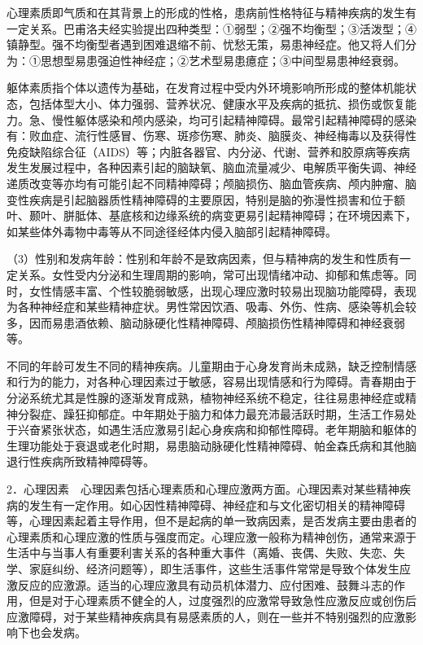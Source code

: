 心理素质即气质和在其背景上的形成的性格，患病前性格特征与精神疾病的发生有一定关系。巴甫洛夫经实验提出四种类型：①弱型；②强不均衡型；③活泼型；④镇静型。强不均衡型者遇到困难退缩不前、忧愁无策，易患神经症。他又将人们分为：①思想型易患强迫性神经症；②艺术型易患癔症；③中间型易患神经衰弱。

躯体素质指个体以遗传为基础，在发育过程中受内外环境影响所形成的整体机能状态，包括体型大小、体力强弱、营养状况、健康水平及疾病的抵抗、损伤或恢复能力。急、慢性躯体感染和颅内感染，均可引起精神障碍。最常引起精神障碍的感染有：败血症、流行性感冒、伤寒、斑疹伤寒、肺炎、脑膜炎、神经梅毒以及获得性免疫缺陷综合征（AIDS）等；内脏各器官、内分泌、代谢、营养和胶原病等疾病发生发展过程中，各种因素引起的脑缺氧、脑血流量减少、电解质平衡失调、神经递质改变等亦均有可能引起不同精神障碍；颅脑损伤、脑血管疾病、颅内肿瘤、脑变性疾病是引起脑器质性精神障碍的主要原因，特别是脑的弥漫性损害和位于额叶、颞叶、胼胝体、基底核和边缘系统的病变更易引起精神障碍；在环境因素下，如某些体外毒物中毒等从不同途径经体内侵入脑部引起精神障碍。

（3）性别和发病年龄：性别和年龄不是致病因素，但与精神病的发生和性质有一定关系。女性受内分泌和生理周期的影响，常可出现情绪冲动、抑郁和焦虑等。同时，女性情感丰富、个性较脆弱敏感，出现心理应激时较易出现脑功能障碍，表现为各种神经症和某些精神症状。男性常因饮酒、吸毒、外伤、性病、感染等机会较多，因而易患酒依赖、脑动脉硬化性精神障碍、颅脑损伤性精神障碍和神经衰弱等。

不同的年龄可发生不同的精神疾病。儿童期由于心身发育尚未成熟，缺乏控制情感和行为的能力，对各种心理因素过于敏感，容易出现情感和行为障碍。青春期由于分泌系统尤其是性腺的逐渐发育成熟，植物神经系统不稳定，往往易患神经症或精神分裂症、躁狂抑郁症。中年期处于脑力和体力最充沛最活跃时期，生活工作易处于兴奋紧张状态，如遇生活应激易引起心身疾病和抑郁性障碍。老年期脑和躯体的生理功能处于衰退或老化时期，易患脑动脉硬化性精神障碍、帕金森氏病和其他脑退行性疾病所致精神障碍等。

2．心理因素　心理因素包括心理素质和心理应激两方面。心理因素对某些精神疾病的发生有一定作用。如心因性精神障碍、神经症和与文化密切相关的精神障碍等，心理因素起着主导作用，但不是起病的单一致病因素，是否发病主要由患者的心理素质和心理应激的性质与强度而定。心理应激一般称为精神创伤，通常来源于生活中与当事人有重要利害关系的各种重大事件（离婚、丧偶、失败、失恋、失学、家庭纠纷、经济问题等），即生活事件，这些生活事件常常是导致个体发生应激反应的应激源。适当的心理应激具有动员机体潜力、应付困难、鼓舞斗志的作用，但是对于心理素质不健全的人，过度强烈的应激常导致急性应激反应或创伤后应激障碍，对于某些精神疾病具有易感素质的人，则在一些并不特别强烈的应激影响下也会发病。

